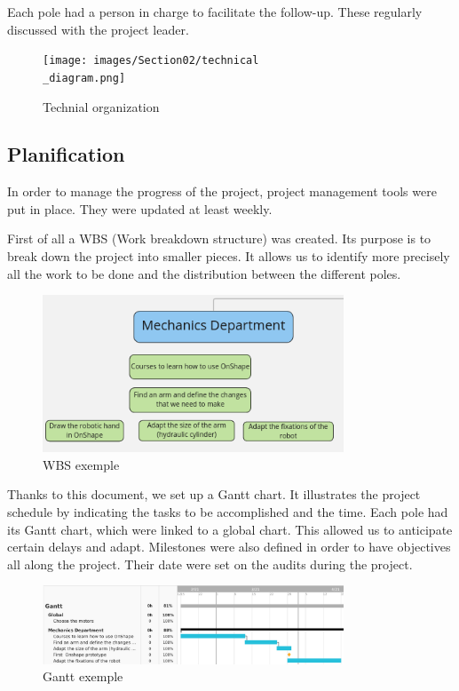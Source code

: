 \bigbreak
Each pole had a person in charge to facilitate the follow-up. These regularly discussed with the project leader.

\begin{figure}[ht]
    \centering
    \texttt{[image: images/Section02/technical\\\_diagram.png]}
    \caption{Technial organization}
    \label{fig:mesh3}
\end{figure}
\FloatBarrier

\subsection{Planification}

In order to manage the progress of the project, project management tools were put in place. They were updated at least weekly.

\bigbreak
First of all a WBS (Work breakdown structure) was created. Its purpose is to break down the project into smaller pieces. It allows us to identify more precisely all the work to be done and the distribution between the different poles. 

\begin{figure}[ht]
    \centering
    \includegraphics[width=0.8\textwidth]{images/Section02/wbs.png}
    \caption{WBS exemple}
    \label{fig:mesh4}
\end{figure}
\FloatBarrier

\bigbreak
Thanks to this document, we set up a Gantt chart. It illustrates the project schedule by indicating the tasks to be accomplished and the time. Each pole had its Gantt chart, which were linked to a global chart. This allowed us to anticipate certain delays and adapt. Milestones were also defined in order to have objectives all along the project. Their date were set on the audits during the project.

\begin{figure}[ht]
    \centering
    \includegraphics[width=0.8\textwidth]{images/Section02/gantt.png}
    \caption{Gantt exemple}
    \label{fig:mesh5}
\end{figure}
\FloatBarrier

